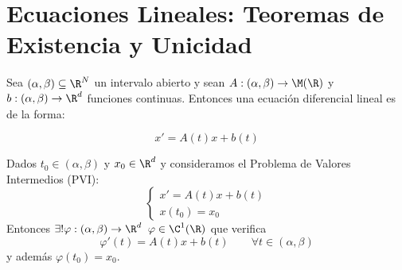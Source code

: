 \section{Ecuaciones Lineales: Teoremas de Existencia y Unicidad}


\begin{ndef}
Sea $(\alpha,\beta)\subseteq \R^N$ un intervalo abierto y sean $A:(\alpha,\beta)\to \M (\R)$ y $b:(\alpha,\beta)\to \R^d$ funciones continuas. Entonces una ecuación diferencial lineal es de la forma:

\begin{equation}
x'=A(t)x+b(t) \tag{C} \label{completa}
\end{equation}
\end{ndef}

\begin{nth}
Dados $t_0\in(\alpha,\beta)$ y $x_0 \in \R^d$ y consideramos el Problema de Valores Intermedios (PVI):
\begin{equation}
\left\{\begin{array}{lcl}
x'=A(t)x+b(t) \\
x(t_0)=x_0
\end{array}\right.
\tag{PVI}\label{PVI}
\end{equation}
Entonces $\exists ! \varphi : (\alpha,\beta)\to\R^d \; \; \varphi \in \C ^ 1(\R)$ que verifica
$$\varphi ' (t)=A(t)x+ b(t) \qquad \forall t \in (\alpha,\beta)$$
y además $\varphi(t_0)=x_0$.
\end{nth}

